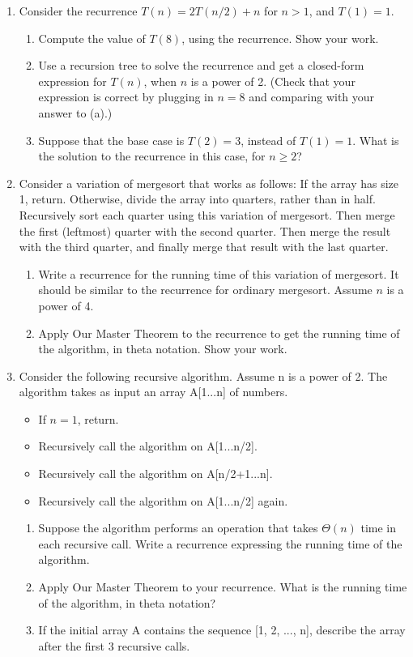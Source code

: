 \documentclass{article}
\begin{document}
\begin{enumerate}
    \item Consider the recurrence $T(n) = 2T(n/2) + n$ for $n > 1$, and $T(1) = 1$.
    \begin{enumerate}
        \item Compute the value of $T(8)$, using the recurrence. Show your work.
        \item Use a recursion tree to solve the recurrence and get a closed-form expression for $T(n)$, when $n$ is a power of 2. (Check that your expression is correct by plugging in $n = 8$ and comparing with your answer to (a).)
        \item Suppose that the base case is $T(2) = 3$, instead of $T(1) = 1$. What is the solution to the recurrence in this case, for $n \ge 2$?
    \end{enumerate}

    \item Consider a variation of mergesort that works as follows: If the array has size 1, return. Otherwise, divide the array into quarters, rather than in half. Recursively sort each quarter using this variation of mergesort. Then merge the first (leftmost) quarter with the second quarter. Then merge the result with the third quarter, and finally merge that result with the last quarter.
    \begin{enumerate}
        \item Write a recurrence for the running time of this variation of mergesort. It should be similar to the recurrence for ordinary mergesort. Assume $n$ is a power of 4.
        \item Apply Our Master Theorem to the recurrence to get the running time of the algorithm, in theta notation. Show your work.
    \end{enumerate}

    \item Consider the following recursive algorithm. Assume n is a power of 2.  The algorithm takes as input an array A[1...n] of numbers.
    \begin{itemize}
        \item If $n=1$, return.
        \item Recursively call the algorithm on A[1...n/2].
        \item Recursively call the algorithm on A[n/2+1...n].
        \item Recursively call the algorithm on A[1...n/2] again.
    \end{itemize}
    \begin{enumerate}
        \item Suppose the algorithm performs an operation that takes $\Theta(n)$ time in each recursive call. Write a recurrence expressing the running time of the algorithm.
        \item Apply Our Master Theorem to your recurrence. What is the running time of the algorithm, in theta notation?
        \item If the initial array A contains the sequence [1, 2, ..., n], describe the array after the first 3 recursive calls.
    \end{enumerate}


\end{enumerate}
\end{document}
